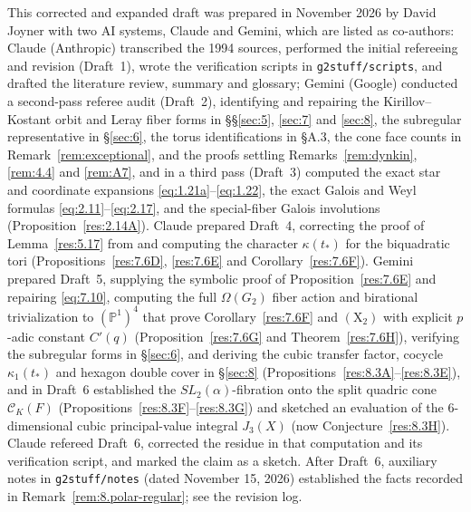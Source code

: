 \documentclass[12pt,letterpaper]{amsart}
\theoremstyle{plain}
\theoremstyle{definition}
\theoremstyle{remark}
\theoremstyle{definition}
\begin{document}
This corrected and expanded draft was prepared in November 2026 by David
Joyner with two AI systems, Claude and Gemini, which are listed as
co-authors: Claude (Anthropic) transcribed the 1994 sources,
performed the initial refereeing and revision (Draft~1), wrote the verification
scripts in \texttt{g2stuff/scripts}, and drafted the literature review, summary
and glossary; Gemini (Google) conducted a second-pass referee audit (Draft~2),
identifying and repairing the Kirillov--Kostant orbit and Leray fiber forms in
\S\S\ref{sec:5}, \ref{sec:7} and \ref{sec:8}, the subregular representative in
\S\ref{sec:6}, the torus identifications in \S A.3, the cone face counts in
Remark~\ref{rem:exceptional}, and the proofs settling Remarks~\ref{rem:dynkin},
\ref{rem:4.4} and \ref{rem:A7}, and in a third pass (Draft~3) computed the exact
star and coordinate expansions \eqref{eq:1.21a}--\eqref{eq:1.22}, the exact
Galois and Weyl formulas \eqref{eq:2.11}--\eqref{eq:2.17}, and the special-fiber
Galois involutions (Proposition~\ref{res:2.14A}). Claude prepared Draft~4,
correcting the proof of Lemma~\ref{res:5.17} from \cite{Ha92a} and computing
the character $\kappa(t_*)$ for the biquadratic tori
(Propositions~\ref{res:7.6D}, \ref{res:7.6E} and Corollary~\ref{res:7.6F}).
Gemini prepared Draft~5, supplying the symbolic proof of
Proposition~\ref{res:7.6E} and repairing \eqref{eq:7.10}, computing the full
$\Omega(G_2)$ fiber action and birational trivialization to $(\mathbb{P}^1)^4$
that prove Corollary~\ref{res:7.6F} and $(\mathrm X_2)$ with explicit $p$-adic
constant $C'(q)$ (Proposition~\ref{res:7.6G} and Theorem~\ref{res:7.6H}),
verifying the subregular forms in \S\ref{sec:6}, and deriving the cubic transfer
factor, cocycle $\kappa_1(t_*)$ and hexagon double cover in \S\ref{sec:8}
(Propositions~\ref{res:8.3A}--\ref{res:8.3E}), and in Draft~6 established the
$SL_2(\alpha)$-fibration onto the split quadric cone $\mathcal C_K(F)$
(Propositions~\ref{res:8.3F}--\ref{res:8.3G}) and sketched an evaluation of the
$6$-dimensional cubic principal-value integral $J_3(X)$
(now Conjecture~\ref{res:8.3H}). Claude refereed Draft~6, corrected the residue
in that computation and its verification script, and marked the claim as a
sketch. After Draft~6, auxiliary notes in \texttt{g2stuff/notes} (dated
November 15, 2026) established the facts recorded in
Remark~\ref{rem:8.polar-regular}; see the revision log.
\end{document}
